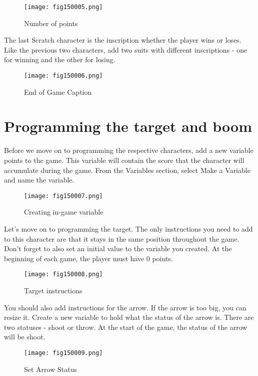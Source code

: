 \begin{figure}[H]
   \centering
   \texttt{[image: fig150005.png]}
   \caption{Number of points}
\label{fig150005}
\end{figure}

The last Scratch character is the inscription whether the player wins or loses. Like the previous two characters, add two suits with different inscriptions - one for winning and the other for losing.

\begin{figure}[H]
   \centering
   \texttt{[image: fig150006.png]}
   \caption{End of Game Caption}
\label{fig150006}
\end{figure}

\section{Programming the target and boom}
Before we move on to programming the respective characters, add a new variable points to the game. This variable will contain the score that the character will accumulate during the game. From the Variables section, select Make a Variable and name the variable.

\begin{figure}[H]
   \centering
   \texttt{[image: fig150007.png]}
   \caption{Creating in-game variable}
\label{fig150007}
\end{figure}

Let's move on to programming the target. The only instructions you need to add to this character are that it stays in the same position throughout the game. Don't forget to also set an initial value to the variable you created. At the beginning of each game, the player must have 0 points.

\begin{figure}[H]
   \centering
   \texttt{[image: fig150008.png]}
   \caption{Target instructions}
\label{fig150008}
\end{figure}

You should also add instructions for the arrow. If the arrow is too big, you can resize it. Create a new variable to hold what the status of the arrow is. There are two statuses - shoot or throw. At the start of the game, the status of the arrow will be shoot.

\begin{figure}[H]
   \centering
   \texttt{[image: fig150009.png]}
   \caption{Set Arrow Status}
\label{fig150009}
\end{figure}

